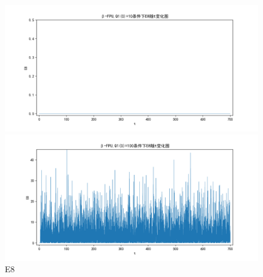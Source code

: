 \documentclass[10pt, a4paper]{article}
\begin{document}
    \begin{figure}[H]
        \begin{minipage}[t]{0.49\textwidth}
            \centering
            \includegraphics[width=\textwidth]{./q6_pics/cmp/E8.png}
        \end{minipage}
        \begin{minipage}[t]{0.49\textwidth}
            \centering
            \includegraphics[width=\textwidth]{./q6_pics/exp/E8.png}
        \end{minipage}
        \caption{E8}\label{fig:E8 in q6}
    \end{figure}
\end{document}
